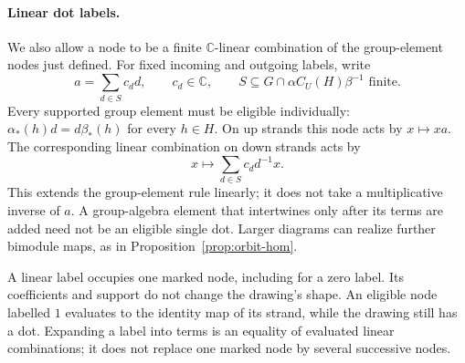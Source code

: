 \documentclass[11pt,a4paper]{article}
\numberwithin{equation}{section}
\theoremstyle{definition}
\newcommand{\C}{\mathbb C}
\newcommand{\co}[1]{\overline{#1}}
\begin{document}
\begin{center}
\end{center}

\paragraph{Linear dot labels.}
We also allow a node to be a finite \(\C\)-linear combination of the
group-element nodes just defined. For fixed incoming and outgoing
labels, write
\[
 a=\sum_{d\in S}c_d d,\qquad c_d\in\C,\qquad
 S\subseteq G\cap\alpha C_U(H)\beta^{-1}\text{ finite}.
\]
Every supported group element must be eligible individually:
\(\alpha_*(h)d=d\beta_*(h)\) for every \(h\in H\).
On up strands this node acts by \(x\mapsto xa\). The corresponding
linear combination on down strands acts by
\[
 x\longmapsto\sum_{d\in S}c_d d^{-1}x.
\]
This extends the group-element rule linearly; it does not take a
multiplicative inverse of \(a\). A group-algebra element that
intertwines only after its terms are added need not be an eligible
single dot. Larger diagrams can realize further bimodule maps, as
in Proposition~\ref{prop:orbit-hom}.

A linear label occupies one marked node, including for a zero label.
Its coefficients and support do not change the drawing's shape.
An eligible node labelled \(1\) evaluates to the identity map of its
strand, while the drawing still has a dot. Expanding a label into
terms is an equality of evaluated linear combinations; it does not
replace one marked node by several successive nodes.
\end{document}
